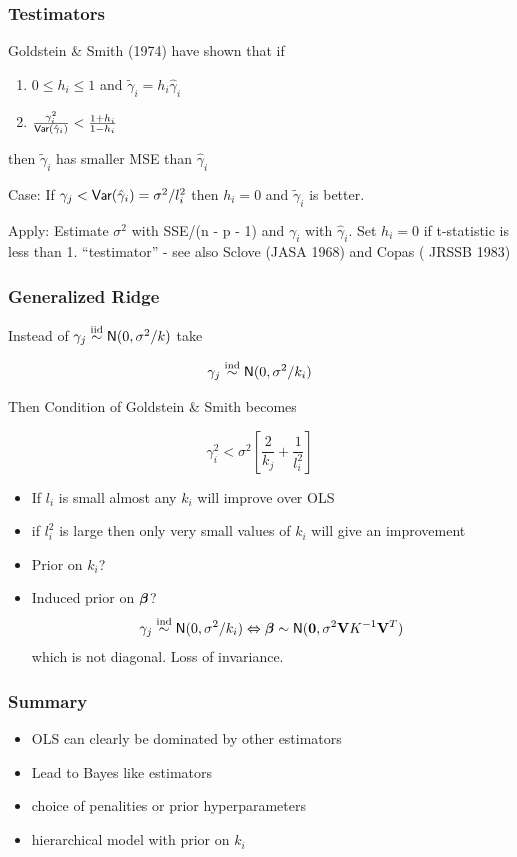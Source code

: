 \documentclass[]{beamer}\usepackage[]{graphicx}\usepackage[]{color}
\begin{document}
\begin{frame} \frametitle{Testimators}

Goldstein \& Smith (1974) have shown that if

\begin{enumerate}
\item
$0 \leq  h_i \leq 1$ and  $\tilde{\gamma}_i = h_i \hat{\gamma}_i$
\item $\frac{\gamma^2_i}{\textsf{Var}(\hat{\gamma}_i)} < \frac{1 + h_i}{1 - h_i}$
\end{enumerate}
then   $\tilde{\gamma}_i$ has smaller MSE than $\hat{\gamma}_i$

\vspace{14pt}
Case:  If $\gamma_j < \textsf{Var}(\hat{\gamma}_i) = \sigma^2/l_i^2$  then
$h_i = 0$ and $\tilde{\gamma}_i$ is better.

\vspace{11pt}
Apply: Estimate $\sigma^2$ with SSE/(n - p - 1) and $\gamma_i$ with
$\hat{\gamma}_i$.  Set $h_i = 0$ if t-statistic is less than 1.
\vfill
``testimator'' - see also Sclove (JASA 1968) and Copas ( JRSSB 1983)
\end{frame}
\begin{frame} \frametitle{Generalized Ridge}


Instead of $\gamma_j \mathrel{\mathop{\sim}\limits^{\rm iid}} \textsf{N}(0, \sigma^2/k)$ take

$$\gamma_j \mathrel{\mathop{\sim}\limits^{\rm ind}} \textsf{N}(0, \sigma^2/k_i)$$  \pause

Then Condition of Goldstein \& Smith becomes

$$
\gamma_i^2 < \sigma^2\left[ \frac{2}{k_j} + \frac{1}{l_i^2}  \right]
$$ \pause
\begin{itemize}
\item
If $l_i$ is small almost any $k_i$ will improve over OLS \pause
\item
if $l_i^2$ is large then only very small values of $k_i$ will give an
improvement \pause
\item Prior on $k_i$?   \pause
\item Induced prior on $\boldsymbol{\beta}$?
$$\gamma_j \mathrel{\mathop{\sim}\limits^{\rm ind}} \textsf{N}(0, \sigma^2/k_i) \Leftrightarrow
\boldsymbol{\beta} \sim \textsf{N}(\mathbf{0}, \sigma^2 \mathbf{V} K^{-1} \mathbf{V}^T)$$
which is not diagonal.   Loss of invariance.
\end{itemize}

\end{frame}
\begin{frame} \frametitle{Summary }

  \begin{itemize}
  \item OLS can clearly be dominated by other estimators
  \item Lead to Bayes like estimators
  \item choice of penalities or prior hyperparameters
  \item hierarchical model with prior on $k_i$
  \end{itemize}

\end{frame}
\end{document}
